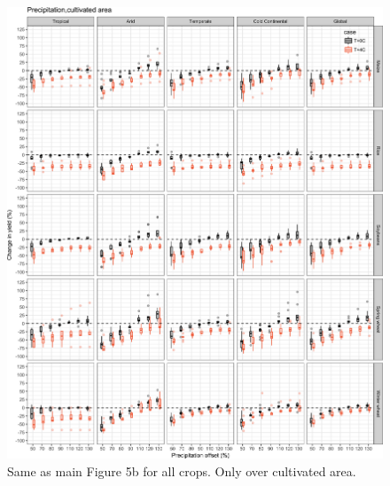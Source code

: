 \documentclass[10pt]{article}
\begin{document}
\begin{figure}[h!]
    \centering
    \includegraphics[width=\textwidth]{s_sim_CG_W_area.png}
    \caption{Same as main Figure 5b for all crops. Only over cultivated area.}
    \label{fig:water}
\end{figure}
\end{document}
